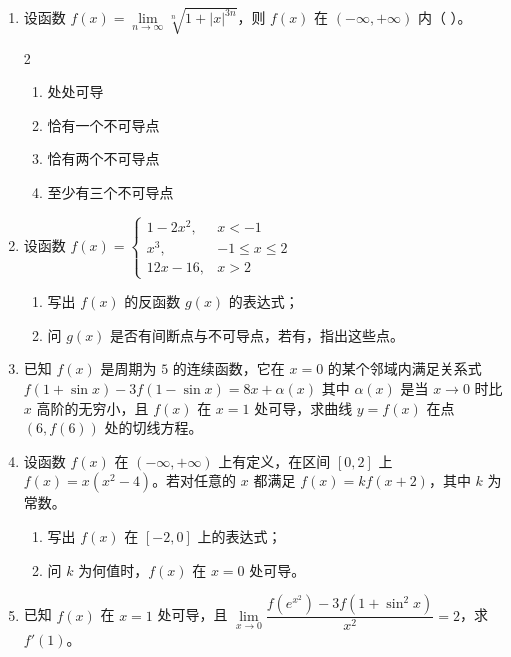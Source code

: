 \begin{enumerate}[label=\textbf{\arabic*.}, itemsep=4.7cm]
\newpage

    \item 设函数 $f(x) = \lim\limits_{n \to \infty} \sqrt[n]{1 + |x|^{3n}}$，则 $f(x)$ 在 $(-\infty, +\infty)$ 内（ \quad ）。
    \begin{multicols}{2}
        \begin{enumerate}[label=(\Alph*)]
            \item 处处可导
            \item 恰有一个不可导点
            \item 恰有两个不可导点
            \item 至少有三个不可导点
        \end{enumerate}
    \end{multicols}

    \item 设函数 $f(x) = \begin{cases} 1 - 2x^2, & x < -1 \\ x^3, & -1 \le x \le 2 \\ 12x - 16, & x > 2 \end{cases}$
    \begin{enumerate}[label=(\arabic*)]
        \item 写出 $f(x)$ 的反函数 $g(x)$ 的表达式；
        \item 问 $g(x)$ 是否有间断点与不可导点，若有，指出这些点。
    \end{enumerate}

    \item 已知 $f(x)$ 是周期为 $5$ 的连续函数，它在 $x=0$ 的某个邻域内满足关系式
    $ f(1 + \sin x) - 3f(1 - \sin x) = 8x + \alpha(x) $
    其中 $\alpha(x)$ 是当 $x \to 0$ 时比 $x$ 高阶的无穷小，且 $f(x)$ 在 $x=1$ 处可导，求曲线 $y=f(x)$ 在点 $(6, f(6))$ 处的切线方程。

\newpage

    \item 设函数 $f(x)$ 在 $(-\infty, +\infty)$ 上有定义，在区间 $[0, 2]$ 上 $f(x) = x(x^2 - 4)$。若对任意的 $x$ 都满足 $f(x) = kf(x+2)$，其中 $k$ 为常数。
    \begin{enumerate}[label=(\arabic*)]
        \item 写出 $f(x)$ 在 $[-2, 0]$ 上的表达式；
        \item 问 $k$ 为何值时，$f(x)$ 在 $x=0$ 处可导。
    \end{enumerate}

    \item 已知 $f(x)$ 在 $x=1$ 处可导，且 $\lim\limits_{x \to 0} \dfrac{f(e^{x^2}) - 3f(1 + \sin^2 x)}{x^2} = 2$，求 $f'(1)$。


\end{enumerate}
